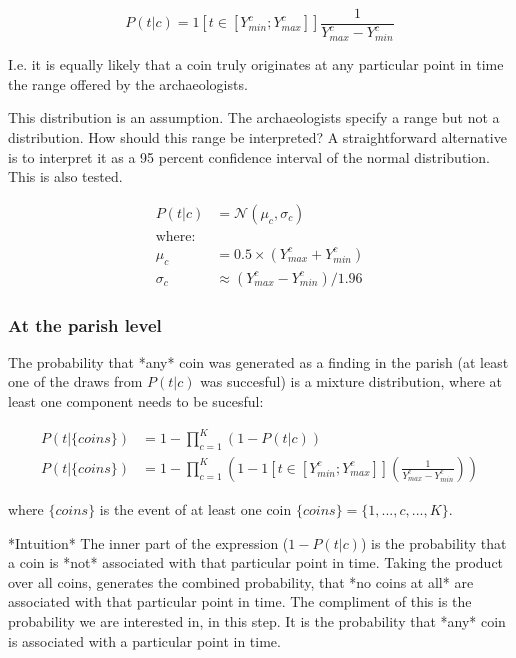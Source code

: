 \begin{equation}
P(t|c)=1[t\in [Y_{min}^c;Y_{max}^c]]\frac{1}{Y_{max}^c - Y_{min}^c}
\end{equation}

I.e. it is equally likely that a coin truly originates at any particular point in time the range offered by the archaeologists. 

This distribution is an assumption. The archaeologists specify a range but not a distribution. How should this range be interpreted? A straightforward alternative is to interpret it as a 95 percent confidence interval of the normal distribution. This is also tested. 

\begin{equation}
\begin{split}
P(t|c)&=\mathcal{N}(\mu_c,\sigma_c)\\
\text{where:} \\
\mu_c&=0.5\times(Y_{max}^c + Y_{min}^c)\\
\sigma_c&\approx(Y_{max}^c - Y_{min}^c)/1.96
\end{split}
\end{equation}

\subsubsection{At the parish level}
The probability that *any* coin was generated as a finding in the parish (at least one of the draws from $P(t|c)$ was succesful) is a mixture distribution, where at least one component needs to be sucesful:

\begin{equation}
\begin{split}
P(t|\{coins\})&=1-\prod_{c=1}^K \left( 1 - P(t|c) \right) \\
P(t|\{coins\})&=1-\prod_{c=1}^K \left(1 - 1[t\in [Y_{min}^c;Y_{max}^c]] \left(\frac{1}{Y_{max}^c - Y_{min}^c}\right) \right)
\end{split}
\end{equation}

where $\{coins\}$ is the event of at least one coin $\{coins\}=\{1,...,c,...,K\}$. 

*Intuition*
The inner part of the expression ($1 - P(t|c)$) is the probability that a coin is *not* associated with that particular point in time. Taking the product over all coins, generates the combined probability, that *no coins at all* are associated with that particular point in time. The compliment of this is the probability we are interested in, in this step. It is the probability that *any* coin is associated with a particular point in time. 

